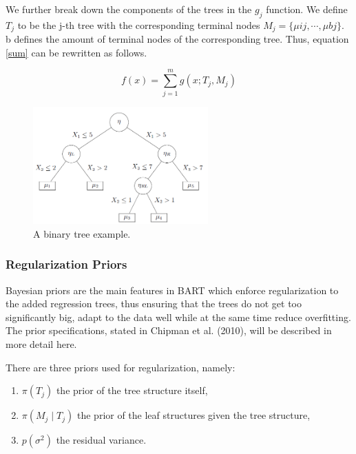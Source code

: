 \documentclass{usiinftr}
\begin{document}
We further break down the components of the trees in the $g_j$ function. We define $T_j$ to be the j-th tree with the corresponding terminal nodes $M_j = \{ \mu{ij}, \cdots, \mu{bj} \}$. b defines the amount of terminal nodes of the corresponding tree. Thus, equation \ref{sum} can be rewritten as follows.

\begin{equation} \label{sum1}
f(x)= \sum_{j=1}^{m} g(x;T_j,M_j)
\end{equation}

\begin{figure}[h!] 
\centering
\includegraphics[width=0.6\textwidth]{images/image113.png}
\caption{A binary tree example.}
\label{bintree}
\end{figure}

\subsubsection{Regularization Priors}\label{prior}
Bayesian priors are the main features in BART which enforce regularization to the added regression trees, thus ensuring that the trees do not get too significantly big, adapt to the data well while at the same time reduce overfitting. The prior specifications, stated in Chipman et al. (2010), will be described in more detail here.

There are three priors used for regularization, namely:
\begin{enumerate}
\item $\pi(T_j)$ the prior of the tree structure itself,
\item $\pi(M_j \mid T_j)$ the prior of the leaf structures given the tree structure, 
\item $p(\sigma^2)$ the residual variance.
\end{enumerate}
\end{document}

